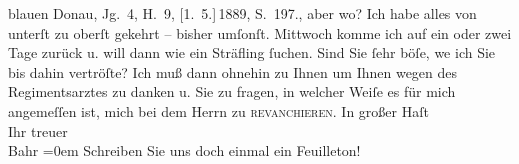 \begin{ledgroupsized}[t]{13cm}
{{{{                        blauen Donau}, Jg. 4, H. 9, {[}1. 5.{]} 1889,
                  S. 197.}}}\label{K_L00252-2h}, aber wo? Ich habe alles von unterſt zu oberſt gekehrt –
               bisher umſonſt. Mittwoch komme ich {\pb}auf ein oder
               zwei Tage zurück u. will dann wie ein Sträfling ſuchen. Sind Sie ſehr böſe, we{\geminationn} ich Sie bis dahin vertröſte?\pend
           \pstart
           Ich muß dann ohnehin zu Ihnen um Ihnen wegen des Regimentsarztes zu danken u. Sie zu fragen, in welcher
               Weiſe es für mich angemeſſen ist, mich bei dem Herrn zu \textsc{revan{\pb}chieren}.\pend
           \pstart
           In großer Haſt{\\[\baselineskip]}Ihr treuer{\\[\baselineskip]}\spacefill\mbox{Bahr}\pend
           \leftskip=0em{}\pstart
           \noindent{}Schreiben Sie uns doch einmal ein Feuilleton!\pend
           
         
         \endnumbering{}\end{ledgroupsized}  \newcommand{\dateiname}{L00252}\newcommand{\titel}{Hermann Bahr an Arthur Schnitzler, [12. 8. 1893]}\newcommand{\editorInnen}{ Kurt Ifkovits,  Martin Anton Müller}
      